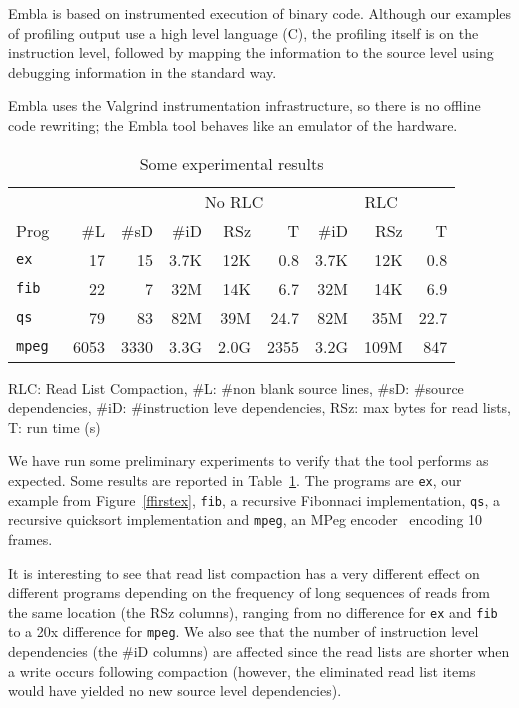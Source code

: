 \documentclass{acm_proc_article-sp}
\begin{document}
Embla is based on instrumented execution of binary code. Although
our examples of profiling output use a high level language (C),
the profiling itself is on the instruction level, followed by 
mapping the information to the source level using debugging information 
in the standard way.

Embla uses the Valgrind instrumentation infrastructure, so there
is no offline code rewriting; the Embla tool behaves like an emulator
of the hardware.

\begin{table}
\begin{center} \newcommand{\sms}{\hskip0.4em}
\begin{tabular}{|@{\sms}l@{\sms}|r@{\sms}r|r@{\sms}r@{\sms}r|r@{\sms}r@{\sms}r|} \hline
 & & & \multicolumn{3}{|c|}{No RLC} & 
\multicolumn{3}{c|}{RLC} \\
Prog & \#L & \#sD & \#iD & RSz & T 
                              & \#iD & RSz & T \\ \hline
\tt ex & 17 & 15 & 3.7K & 12K & 0.8 & 3.7K & 12K & 0.8 \\
\tt fib & 22 & 7 & 32M & 14K & 6.7 & 32M & 14K & 6.9 \\
\tt qs & 79 & 83 & 82M & 39M & 24.7 & 82M & 35M & 22.7 \\
\tt mpeg & 6053 & 3330 & 3.3G & 2.0G & 2355 & 3.2G & 109M & 847 \\ \hline
\end{tabular}
\end{center}
RLC: Read List Compaction, 
\#L: \#non blank source lines, \#sD: \#source dependencies, \#iD: 
\#instruction
leve dependencies, RSz: max bytes for read lists, T: run time (s)
\caption{Some experimental results} \label{trex}
\end{table}

We have run some preliminary experiments to verify that the tool performs as
expected. Some results are reported in Table~\ref{trex}. The programs are 
{\tt ex}, our example from Figure~\ref{ffirstex}, {\tt fib}, a recursive
Fibonnaci implementation, {\tt qs}, a recursive quicksort implementation 
and {\tt mpeg}, an MPeg encoder~\cite{MPEG} encoding 10 frames.

It is interesting
to see that read list compaction has a very different effect on different 
programs depending on the frequency of long sequences of reads from the same 
location (the RSz columns), ranging from no difference for {\tt ex} and 
{\tt fib} to a 20x difference for {\tt mpeg}. We also see that the number of 
instruction 
level dependencies (the \#iD columns) are affected since the read lists 
are shorter when a write occurs following compaction (however, the 
eliminated read list 
items would have yielded no new source level dependencies).
\end{document}
